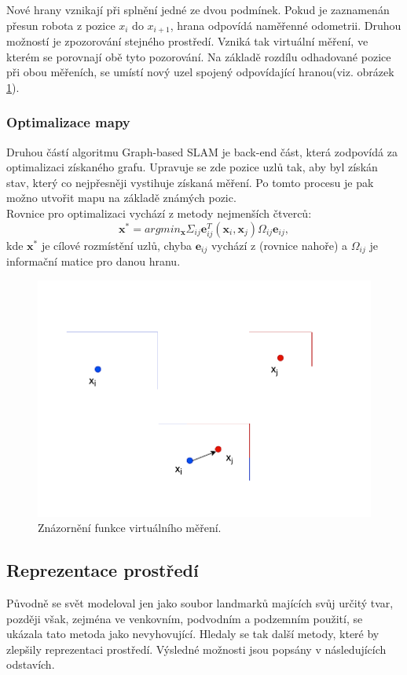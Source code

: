 \documentclass[12pt]{report}
\begin{document}
\indent Nové hrany vznikají při splnění jedné ze dvou podmínek. Pokud je zaznamenán přesun robota z pozice $x_i$ do $x_{i+1}$, hrana odpovídá naměřenné odometrii. Druhou možností je zpozorování stejného prostředí. Vzniká tak virtuální měření, ve kterém se porovnají obě tyto pozorování. Na základě rozdílu odhadované pozice při obou měřeních, se umístí nový uzel spojený odpovídající hranou(viz. obrázek \ref{fig:GBS_virtual_measurment}). 


\subsubsection{Optimalizace mapy}
Druhou částí algoritmu Graph-based SLAM je back-end část, která zodpovídá za optimalizaci získaného grafu. Upravuje se zde pozice uzlů tak, aby byl získán stav, který co nejpřesněji vystihuje získaná měření. Po tomto procesu je pak možno utvořit mapu na základě známých pozic.\\
\indent Rovnice pro optimalizaci vychází z metody nejmenších čtverců:
\begin{equation}
	\textbf{x}^*=argmin_{\textbf{x}}\Sigma_{ij}\textbf{e}_{ij}^T(\textbf{x}_i,\textbf{x}_j)\Omega_{ij}\textbf{e}_{ij},
\end{equation}
kde $\textbf{x}^*$ je cílové rozmístění uzlů, chyba $\textbf{e}_{ij}$ vychází z (rovnice nahoře) a $\Omega_{ij}$ je informační matice pro danou hranu. 

\begin{figure}[!ht]
	\begin{center}
		\includegraphics[width=0.6\columnwidth]{imgs/GBS_virtual_measurment.pdf}
	\end{center}
	\caption{Znázornění funkce virtuálního měření.}
	\label{fig:GBS_virtual_measurment}
\end{figure}

\newpage
\subsection{Reprezentace prostředí}
Původně se svět modeloval jen jako soubor landmarků majících svůj určitý tvar, později však, zejména ve venkovním, podvodním a podzemním použití, se ukázala tato metoda jako nevyhovující. Hledaly se tak další metody, které by zlepšily reprezentaci prostředí. Výsledné možnosti jsou popsány v následujících odstavích.
\end{document}
